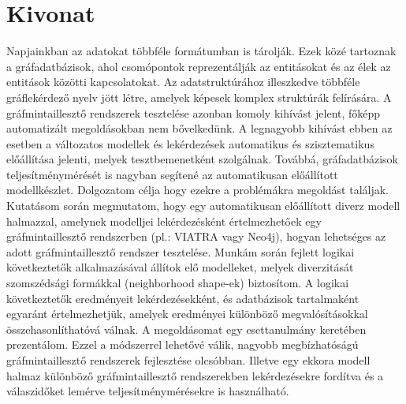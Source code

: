 \setcounter{page}{1}

\selecthungarian

\chapter*{Kivonat}

Napjainkban az adatokat többféle formátumban is tárolják. Ezek közé tartoznak a gráfadatbázisok, ahol  csomópontok reprezentálják az entitásokat és az élek az entitások közötti kapcsolatokat. Az adatstruktúrához illeszkedve többféle gráflekérdező nyelv jött létre, amelyek képesek komplex struktúrák felírására.
A gráfmintaillesztő rendszerek tesztelése azonban komoly kihívást jelent, főképp automatizált megoldásokban nem bővelkedünk. A legnagyobb kihívást ebben az esetben a változatos modellek és lekérdezések automatikus és szisztematikus előállítása jelenti, melyek tesztbemenetként szolgálnak. Továbbá, gráfadatbázisok teljesítménymérését is nagyban segítené  az automatikusan előállított modellkészlet.
Dolgozatom célja hogy ezekre a problémákra megoldást találjak. Kutatásom során   megmutatom, hogy egy automatikusan előállított diverz modell halmazzal, amelynek modelljei lekérdezésként értelmezhetőek egy gráfmintaillesztő rendszerben (pl.: VIATRA vagy Neo4j), hogyan lehetséges  az adott gráfmintaillesztő rendszer tesztelése.
Munkám során fejlett logikai következtetők alkalmazásával állítok elő modelleket, melyek diverzitását szomszédsági formákkal (neighborhood shape-ek) biztosítom. A logikai következtetők eredményeit lekérdezésekként, és adatbázisok tartalmaként egyaránt értelmezhetjük, amelyek eredményei különböző megvalósításokkal összehasonlíthatóvá válnak. A megoldásomat egy esettanulmány keretében prezentálom.
Ezzel a módszerrel lehetővé válik, nagyobb megbízhatóságú gráfmintaillesztő rendszerek fejlesztése olcsóbban. Illetve egy ekkora modell halmaz különböző gráfmintaillesztő rendszerekben lekérdezésekre fordítva és a válaszidőket lemérve teljesítménymérésekre is használható.



\vfill
\selectenglish


